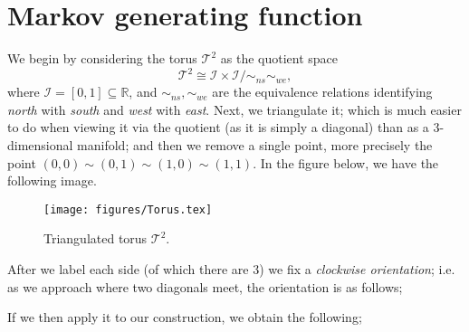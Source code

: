 \section{Markov generating function}
We begin by considering the torus $\mathcal{T}^2$ as the quotient space
\begin{equation*}
    \mathcal{T}^2 \cong \mathcal{I}\times \mathcal{I}/\sim_{ns} \sim_{we},
\end{equation*}
where $\mathcal{I} = [0,1] \subseteq \mathbb{R}$, and $\sim_{ns}, \sim_{we}$ are the equivalence relations identifying \emph{north} with \emph{south} and \emph{west} with \emph{east}. Next, we triangulate it; which is much easier to do when viewing it via the quotient (as it is simply a diagonal) than as a 3-dimensional manifold; and then we remove a single point, more precisely the point $(0,0) \sim (0,1)\sim (1,0) \sim (1,1)$. In the figure below, we have the following image.
\begin{figure}[H]
    \centering
    \texttt{[image: figures/Torus.tex]}
    \label{Torus}
    \caption{Triangulated torus $\mathcal{T}^2$.}
\end{figure}
After we label each side (of which there are 3) we fix a \emph{clockwise orientation}; i.e. as we approach where two diagonals meet, the orientation is as follows;
\begin{figure}[H]
    \centering




    
    
\end{figure}
If we then apply it to our construction, we obtain the following;

